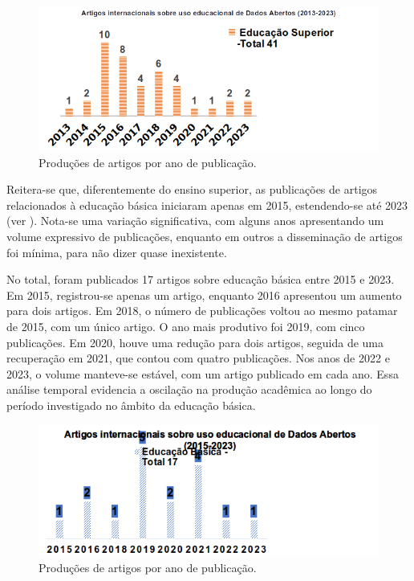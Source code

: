 \documentclass[portuguese]{textolivre}
\begin{document}
\begin{figure}[h!]
\centering
\begin{minipage}{0.75\linewidth}
\includegraphics[width=\linewidth]{Fig3.png}
\caption{Produções de artigos por ano de publicação.}
\label{fig3}
\end{minipage}
\end{figure}

Reitera-se que, diferentemente do ensino superior, as publicações de artigos relacionados à educação básica iniciaram apenas em 2015, estendendo-se até 2023 (ver ). Nota-se uma variação significativa, com alguns anos apresentando um volume expressivo de publicações, enquanto em outros a disseminação de artigos foi mínima, para não dizer quase inexistente. 

No total, foram publicados 17 artigos sobre educação básica entre 2015 e 2023. Em 2015, registrou-se apenas um artigo, enquanto 2016 apresentou um aumento para dois artigos. Em 2018, o número de publicações voltou ao mesmo patamar de 2015, com um único artigo. O ano mais produtivo foi 2019, com cinco publicações. Em 2020, houve uma redução para dois artigos, seguida de uma recuperação em 2021, que contou com quatro publicações. Nos anos de 2022 e 2023, o volume manteve-se estável, com um artigo publicado em cada ano. Essa análise temporal evidencia a oscilação na produção acadêmica ao longo do período investigado no âmbito da educação básica.

\begin{figure}[h]
\centering
\begin{minipage}{0.75\linewidth}
\includegraphics[width=\linewidth]{Fig4.png}
\caption{Produções de artigos por ano de publicação.}
\label{fig4}
\end{minipage}
\end{figure}
\end{document}

